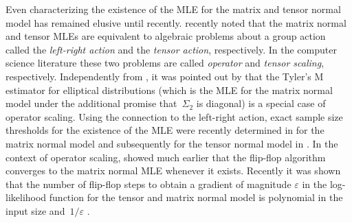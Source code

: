 \documentclass[aos]{imsart}
\theoremstyle{definition}
\numberwithin{equation}{section}
\newcommand{\eps}{\varepsilon}
\newcommand{\CF}[1]{{\color{purple}[CF: #1]}}
\begin{document}
Even characterizing the existence of the MLE for the matrix and tensor normal model has remained elusive until recently.
\cite{amendola2020invariant} recently noted that the matrix normal and tensor MLEs are equivalent to algebraic problems about a group action called the \emph{left-right action} and the \emph{tensor action}, respectively.
In the computer science literature these two problems are called \emph{operator} and \emph{tensor scaling}, respectively.
Independently from \cite{amendola2020invariant}, it was pointed out by \cite{FM20} that the Tyler's M estimator for elliptical distributions (which is the MLE for the matrix normal model under the additional promise that~$\Sigma_2$ is diagonal) is a special case of operator scaling.
Using the connection to the left-right action, exact sample size thresholds for the existence of the MLE were recently determined in \cite{derksen2020matrix} for the matrix normal model and subsequently for the tensor normal model in \cite{derksen2020tensor}.
In the context of operator scaling, \cite{gurvits2004classical} showed much earlier that the flip-flop algorithm converges to the matrix normal MLE whenever it exists.
Recently it was shown that the number of flip-flop steps to obtain a gradient of magnitude $\eps$ in the log-likelihood function for the tensor and matrix normal model is polynomial in the input size and~$1/\eps$ \citep{GGOW19,burgisser2017alternating,burgisser2019towards}.


\end{document}
